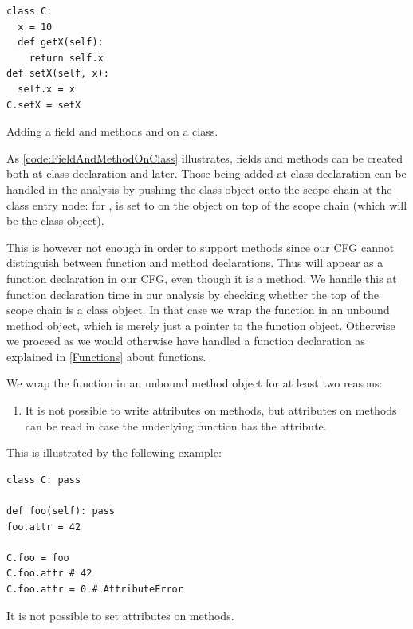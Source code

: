 \begin{listing}[H]
	\begin{verbatim}
class C:
  x = 10
  def getX(self):
    return self.x
def setX(self, x):
  self.x = x
C.setX = setX
	\end{verbatim}
	\caption{Adding a field  and methods  and  on a class.}
	\label{code:FieldAndMethodOnClass}
\end{listing}

As \autoref{code:FieldAndMethodOnClass} illustrates, fields and methods can be created both at class declaration and later. Those being added at class declaration can be handled in the analysis by pushing the class object onto the scope chain at the class entry node: for ,  is set to  on the object on top of the scope chain (which will be the class object).

This is however not enough in order to support methods since our CFG cannot distinguish between function and method declarations. Thus  will appear as a function declaration in our CFG, even though it is a method. We handle this at function declaration time in our analysis by checking whether the top of the scope chain is a class object. In that case we wrap the function in an unbound method object, which is merely just a pointer to the function object. Otherwise we proceed as we would otherwise have handled a function declaration as explained in \autoref{Functions} about functions.

We wrap the function in an unbound method object for at least two reasons:

\begin{enumerate}
	\item It is not possible to write attributes on methods, but attributes on methods can be read in case the underlying function has the attribute.
\end{enumerate}

This is illustrated by the following example:

\begin{listing}[H]
	\begin{verbatim}
class C: pass

def foo(self): pass
foo.attr = 42

C.foo = foo
C.foo.attr # 42
C.foo.attr = 0 # AttributeError
	\end{verbatim}
	\caption{It is not possible to set attributes on methods.}\label{code:FieldAndMethodOnClass}
\end{listing}

